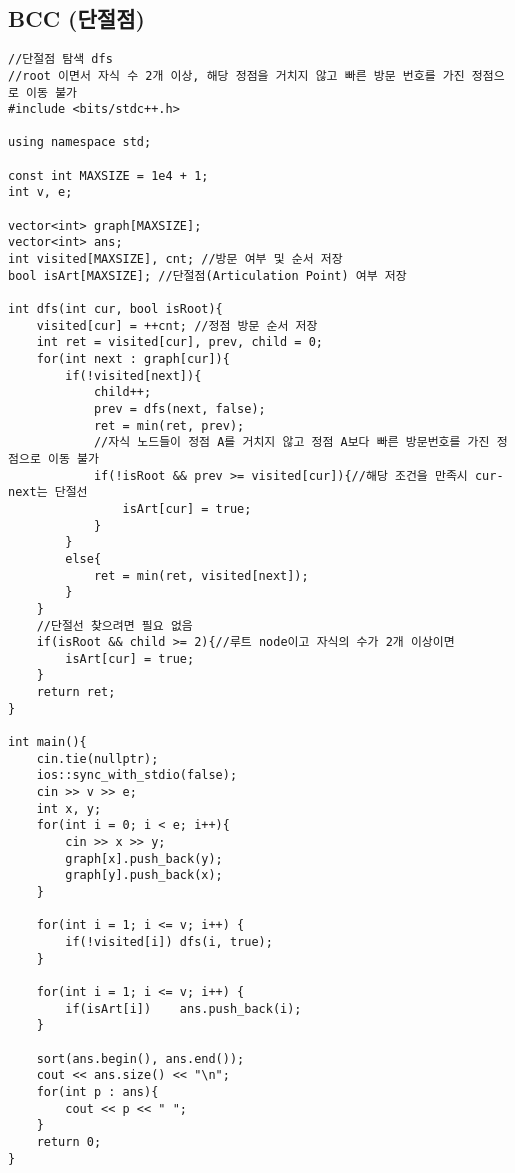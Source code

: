 \documentclass[landscape, 8pt, a4paper, oneside, twocolumn]{extarticle}
\begin{document}
    \subsection{BCC (단절점)}
    \begin{verbatim}
//단절점 탐색 dfs
//root 이면서 자식 수 2개 이상, 해당 정점을 거치지 않고 빠른 방문 번호를 가진 정점으로 이동 불가
#include <bits/stdc++.h>

using namespace std;

const int MAXSIZE = 1e4 + 1;
int v, e;

vector<int> graph[MAXSIZE];
vector<int> ans;
int visited[MAXSIZE], cnt; //방문 여부 및 순서 저장
bool isArt[MAXSIZE]; //단절점(Articulation Point) 여부 저장

int dfs(int cur, bool isRoot){
	visited[cur] = ++cnt; //정점 방문 순서 저장
	int ret = visited[cur], prev, child = 0;
	for(int next : graph[cur]){
		if(!visited[next]){
			child++;
			prev = dfs(next, false);
			ret = min(ret, prev);
            //자식 노드들이 정점 A를 거치지 않고 정점 A보다 빠른 방문번호를 가진 정점으로 이동 불가
			if(!isRoot && prev >= visited[cur]){//해당 조건을 만족시 cur-next는 단절선
				isArt[cur] = true;
			}
		}
		else{
			ret = min(ret, visited[next]);
		}
	}
    //단절선 찾으려면 필요 없음
	if(isRoot && child >= 2){//루트 node이고 자식의 수가 2개 이상이면
		isArt[cur] = true;
	}
	return ret;
}

int main(){
    cin.tie(nullptr);
    ios::sync_with_stdio(false);
    cin >> v >> e;
	int x, y;
	for(int i = 0; i < e; i++){
		cin >> x >> y;
		graph[x].push_back(y);
		graph[y].push_back(x);
	}

	for(int i = 1; i <= v; i++) {
		if(!visited[i])	dfs(i, true);
	}

	for(int i = 1; i <= v; i++) {
		if(isArt[i])	ans.push_back(i);
	}

	sort(ans.begin(), ans.end());
	cout << ans.size() << "\n";
	for(int p : ans){
		cout << p << " ";
	}
    return 0;
}
    \end{verbatim}
\end{document}
